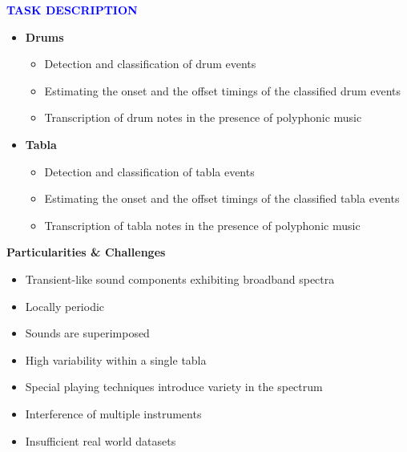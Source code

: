 
\begin{frame}[t,plain]
\titlepage
\end{frame}

\begin{frame}[t]{\textcolor{blue}{\textbf{TASK DESCRIPTION}}}

\begin{itemize}
\item \textbf{Drums}
  \begin{itemize}  
  \item Detection and classification of drum events
  \item Estimating the onset and the offset timings of the classified drum events
  \item Transcription of drum notes in the presence of polyphonic music
  \end{itemize}


\item \textbf{Tabla}
  \begin{itemize}
  \item Detection and classification of tabla events
  \item Estimating the onset and the offset timings of the classified tabla events
  \item Transcription of tabla notes in the presence of polyphonic music
  \end{itemize}
\end{itemize}
\end{frame}

\begin{frame}[t,fragile]{\textbf{Particularities \& Challenges }}
\begin{itemize}
\item Transient-like sound components exhibiting broadband spectra
\item Locally periodic
\item Sounds are superimposed
\item High variability within a single tabla
\item Special playing techniques introduce variety in the spectrum
\item Interference of multiple instruments
\item Insufficient real world datasets
\end{itemize}
\end{frame}

